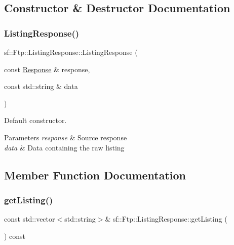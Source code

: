 \subsection{Constructor \& Destructor Documentation}
\mbox{\label{classsf_1_1_ftp_1_1_listing_response_a7e98d0aed70105c71adb52e5b6ce0bb8}} 
\subsubsection{\texorpdfstring{Listing\+Response()}{ListingResponse()}}
{\footnotesize\ttfamily sf\+::\+Ftp\+::\+Listing\+Response\+::\+Listing\+Response (\begin{DoxyParamCaption}\item[{const \hyperlink{classsf_1_1_ftp_1_1_response}{Response} \&}]{response,  }\item[{const std\+::string \&}]{data }\end{DoxyParamCaption})}



Default constructor. 


\begin{DoxyParams}{Parameters}
{\em response} & Source response \\
\hline
{\em data} & Data containing the raw listing \\
\hline
\end{DoxyParams}


\subsection{Member Function Documentation}
\mbox{\label{classsf_1_1_ftp_1_1_listing_response_a6cdcdfcc6a9008c7e1eddb48b164793d}} 
\subsubsection{\texorpdfstring{get\+Listing()}{getListing()}}
{\footnotesize\ttfamily const std\+::vector$<$std\+::string$>$\& sf\+::\+Ftp\+::\+Listing\+Response\+::get\+Listing (\begin{DoxyParamCaption}{ }\end{DoxyParamCaption}) const}



